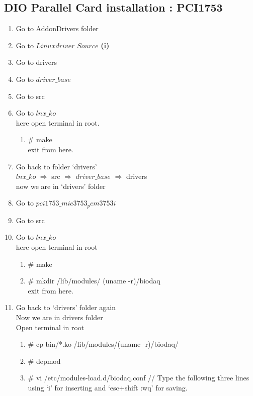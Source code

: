 \subsection{DIO Parallel Card installation : PCI1753}
\begin{enumerate}
	\item [\textbullet] Go to AddonDrivers folder
	\item [\textbullet] Go to $Linuxdriver\_Source$ \textbf{(i)}
	\item [\textbullet] Go to drivers
	\item [\textbullet] Go to $driver\_base$
	\item [\textbullet] Go to src
	\item [\textbullet] Go to $lnx\_ko$ \\
	here open terminal in root. 
		\begin{enumerate}
			\item $\#$ make\\
			exit from here.
		\end{enumerate}
	\item [\textbullet] Go back to folder `drivers'\\
		$lnx\_ko$ $\Rightarrow$ src $\Rightarrow$ $driver\_base$ $\Rightarrow$ drivers\\
		now we are in `drivers' folder
	\item [\textbullet] Go to $pci1753\_mic3753_pcm3753i$ 
	\item [\textbullet] Go to src
	\item [\textbullet] Go to $lnx\_ko$ \\
	here open terminal in root
		\begin{enumerate}
			\item $\#$ make
			\item $\#$ mkdir /lib/modules/ \textdollar (uname -r)/biodaq \\
		exit from here.
		\end{enumerate}
	\item [\textbullet] Go back to `drivers' folder again\\
	Now we are in drivers folder\\
	Open terminal in root
		\begin{enumerate}
			\item $\#$ cp bin/*.ko /lib/modules/\textdollar (uname -r)/biodaq/
			\item $\#$ depmod
			\item $\#$ vi /etc/modules-load.d/biodaq.conf //
			Type the following three lines using `i' for inserting and `esc+shift :wq' for saving. \\

\end{enumerate}
\end{enumerate}
